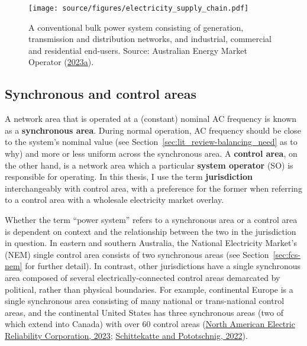 \documentclass[12pt,a4paper,]{report}
\begin{document}
\begin{figure}
\hypertarget{fig:elec_supply_chain}{%
\centering
\texttt{[image: source/figures/electricity\_supply\_chain.pdf]}
\caption[The bulk power system as an electricity supply chain]{A
conventional bulk power system consisting of generation, transmission
and distribution networks, and industrial, commercial and residential
end-users. Source: Australian Energy Market Operator
(\protect\hyperlink{ref-australianenergymarketoperatorIndustryOverview2023}{2023a}).}\label{fig:elec_supply_chain}
}
\end{figure}

\hypertarget{synchronous-and-control-areas}{%
\subsection{Synchronous and control
areas}\label{synchronous-and-control-areas}}

A network area that is operated at a (constant) nominal AC frequency is
known as a \textbf{synchronous area}. During normal operation, AC
frequency should be close to the system's nominal value (see
Section~\ref{sec:lit_review-balancing_need} as to why) and more or less
uniform across the synchronous area. A \textbf{control area}, on the
other hand, is a network area which a particular \textbf{system
operator} (SO) is responsible for operating. In this thesis, I use the
term \textbf{jurisdiction} interchangeably with control area, with a
preference for the former when referring to a control area with a
wholesale electricity market overlay.

Whether the term ``power system'' refers to a synchronous area or a
control area is dependent on context and the relationship between the
two in the jurisdiction in question. In eastern and southern Australia,
the National Electricity Market's (NEM) single control area consists of
two synchronous areas (see Section~\ref{sec:fcs-nem} for further
detail). In contrast, other jurisdictions have a single synchronous area
composed of several electrically-connected control areas demarcated by
political, rather than physical boundaries. For example, continental
Europe is a single synchronous area consisting of many national or
trans-national control areas, and the continental United States has
three synchronous areas (two of which extend into Canada) with over 60
control areas
(\protect\hyperlink{ref-northamericanelectricreliabilitycorporationNERCInterconnections2023}{North
American Electric Reliability Corporation, 2023};
\protect\hyperlink{ref-schittekatteDistributedEnergyResources2022}{Schittekatte
and Pototschnig, 2022}).
\end{document}
